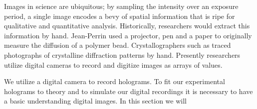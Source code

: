 


Images in science are ubiquitous; by sampling the intensity over an exposure
period, a single image encodes a bevy of spatial information that is ripe
for qualitative and quantitative analysis. Historically, researchers would
extract this information by hand. Jean-Perrin used a projector, pen and a paper to originally
measure the diffusion of a polymer bead. Crystallographers such as %
traced photographs of crystalline diffraction patterns by hand. Presently researchers utilize
digital cameras to record and digitize images as arrays of values. 

We utilize a digital camera to record holograms. To fit our experimental holograms to
theory and to simulate our digital recordings it is necessary to have a basic
understanding digital images. In this section we will 
